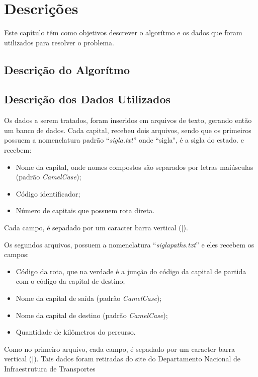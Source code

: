 \chapter*[Descrições]{Descrições}

Este capítulo têm como objetivos descrever o algorítmo e os dados que foram utilizados para resolver o problema.

\section{Descrição do Algorítmo}


\section{Descrição dos Dados Utilizados}

Os dados a serem tratados, foram inseridos em arquivos de texto, gerando então um banco de dados. Cada 
capital, recebeu dois arquivos, sendo que os primeiros possuem a nomenclatura padrão ``\textit{sigla.txt}'' onde ``sigla", é a sigla do estado.
e recebem: 

\begin{itemize}
 	\item Nome da capital, onde nomes compostos são separados por letras maiúsculas (padrão \textit{CamelCase});
    \item Código identificador;
	\item Número de capitais que possuem rota direta. 
\end{itemize}

Cada campo, é sepadado por um caracter barra vertical (|). 

Os segundos arquivos, possuem a nomenclatura ``\textit{sigla\underline{\hspace{.1in}}paths.txt}'' e eles recebem os campos:

\begin{itemize}
	\item Código da rota, que na verdade é a junção do código da capital de partida com o código da capital de destino;
	\item Nome da capital de saída (padrão \textit{CamelCase});
	\item Nome da capital de destino (padrão \textit{CamelCase});
	\item Quantidade de kilômetros do percurso.
\end{itemize}

Como no primeiro arquivo, cada campo, é sepadado por um caracter barra vertical (|). Tais dados foram retiradas do site do Departamento Nacional de Infraestrutura de Transportes \cite{DNIT}
